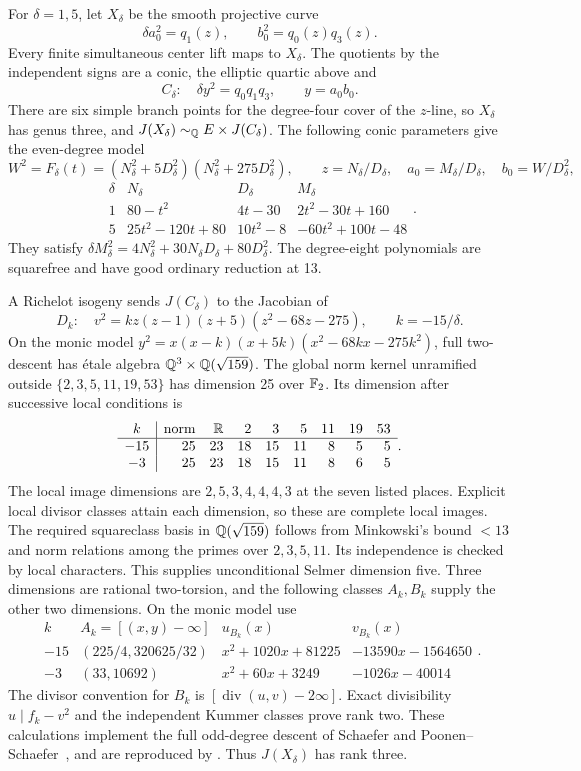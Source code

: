 For $\delta=1,5$, let $X_\delta$ be the smooth projective curve
\[
 \delta a_0^2=q_1(z),\qquad b_0^2=q_0(z)q_3(z).
\]
Every finite simultaneous center lift maps to $X_\delta$. The quotients
by the independent signs are a conic, the elliptic quartic above and
\[
 C_\delta:\quad \delta y^2=q_0q_1q_3,\qquad y=a_0b_0.
\]
There are six simple branch points for the degree-four cover of the
$z$-line, so $X_\delta$ has genus three, and
$J(X_\delta)\sim_{\mathbb Q}E\times J(C_\delta)$.
The following conic parameters give the even-degree model
\begin{equation}\label{eq:t10-model}
 W^2=F_\delta(t)=(N_\delta^2+5D_\delta^2)
                         (N_\delta^2+275D_\delta^2),\qquad
 z=N_\delta/D_\delta,\quad a_0=M_\delta/D_\delta,\quad
 b_0=W/D_\delta^2,
\end{equation}
\[
\begin{array}{c|lll}
\delta&N_\delta&D_\delta&M_\delta\\ \hline
1&80-t^2&4t-30&2t^2-30t+160\\
5&25t^2-120t+80&10t^2-8&-60t^2+100t-48
\end{array}.
\]
They satisfy $\delta M_\delta^2=4N_\delta^2+30N_\delta D_\delta+
80D_\delta^2$. The degree-eight polynomials are squarefree and have
good ordinary reduction at 13.

A Richelot isogeny sends $J(C_\delta)$ to the Jacobian of
\[
 D_k:\quad v^2=kz(z-1)(z+5)(z^2-68z-275),\qquad k=-15/\delta.
\]
On the monic model $y^2=x(x-k)(x+5k)(x^2-68kx-275k^2)$,
full two-descent has étale algebra
$\mathbb Q^3\times\mathbb Q(\sqrt{159})$. The global norm kernel
unramified outside $\{2,3,5,11,19,53\}$ has dimension 25 over
$\mathbb F_2$. Its dimension after successive local conditions is
\[
\begin{array}{c|rrrrrrrr}
 k&\mathrm{norm}&\mathbb R&2&3&5&11&19&53\\ \hline
 -15&25&23&18&15&11&8&5&5\\
 -3 &25&23&18&15&11&8&6&5
\end{array}.
\]
The local image dimensions are $2,5,3,4,4,4,3$ at the seven listed
places. Explicit local divisor classes attain each dimension, so these
are complete local images. The required squareclass basis in
$\mathbb Q(\sqrt{159})$ follows from Minkowski's bound $<13$ and
norm relations among the primes over $2,3,5,11$. Its independence is
checked by local characters. This supplies unconditional Selmer dimension
five. Three dimensions are rational two-torsion, and the following
classes $A_k,B_k$ supply the other two dimensions. On the monic model
use
\[
\begin{array}{c|c|ll}
 k&A_k=[(x,y)-\infty]&u_{B_k}(x)&v_{B_k}(x)\\ \hline
 -15&(225/4,320625/32)&x^2+1020x+81225&-13590x-1564650\\
 -3 &(33,10692)&x^2+60x+3249&-1026x-40014
\end{array}.
\]
The divisor convention for $B_k$ is $[\operatorname{div}(u,v)-2\infty]$.
Exact divisibility $u\mid f_k-v^2$ and the independent Kummer classes
prove rank two. These calculations implement the full odd-degree descent
of Schaefer and Poonen--Schaefer~\cite{Schaefer1995,PoonenSchaefer}, and are reproduced by
. Thus $J(X_\delta)$ has rank three.


